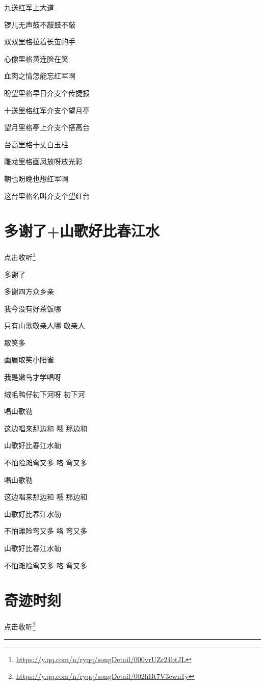 \documentclass[]{ctexbook}
\renewcommand{\href}[2]{#2\footnote{\url{#1}}}
\begin{document}
九送红军上大道

锣儿无声鼓不敲鼓不敲

双双里格拉着长茧的手

心像里格黄连脸在笑

血肉之情怎能忘红军啊

盼望里格早日介支个传捷报

十送里格红军介支个望月亭

望月里格亭上介支个搭高台

台高里格十丈白玉柱

雕龙里格画凤放呀放光彩

朝也盼晚也想红军啊

这台里格名叫介支个望红台

\section*{多谢了+山歌好比春江水}\label{folk-songs-like-spring-river}


\href{https://y.qq.com/n/ryqq/songDetail/000vrUZr24btJL}{点击收听}

多谢了

多谢四方众乡亲

我今没有好茶饭哪

只有山歌敬亲人哪 敬亲人

取笑多

画眉取笑小阳雀

我是嫩鸟才学唱呀

绒毛鸭仔初下河呀 初下河

唱山歌勒

这边唱来那边和 哦 那边和

山歌好比春江水勒

不怕险滩弯又多 咯 弯又多

唱山歌勒

这边唱来那边和 哦 那边和

山歌好比春江水勒

不怕滩险弯又多 咯 弯又多

山歌好比春江水勒

不怕滩险弯又多 咯 弯又多

\section*{奇迹时刻}\label{magic-moment}


\href{https://y.qq.com/n/ryqq/songDetail/002hBt7V3cwn1y}{点击收听}

\begin{center}\rule{0.5\linewidth}{0.5pt}\end{center}
\end{document}
